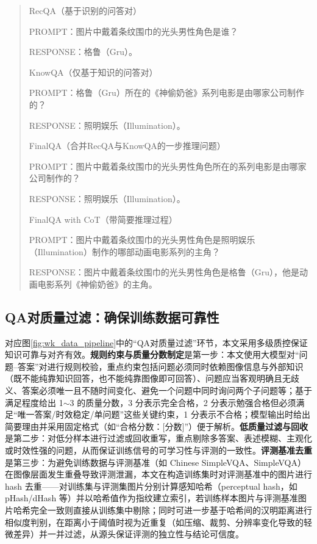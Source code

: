 \begin{quote}\small
RecQA（基于识别的问答对）
\par
PROMPT：图片中戴着条纹围巾的光头男性角色是谁？
\par
RESPONSE：格鲁（Gru）。
\par\medskip
KnowQA（仅基于知识的问答对）
\par
PROMPT：格鲁（Gru）所在的《神偷奶爸》系列电影是由哪家公司制作的？
\par
RESPONSE：照明娱乐（Illumination）。
\par\medskip
FinalQA（合并RecQA与KnowQA的一步推理问题）
\par
PROMPT：图片中戴着条纹围巾的光头男性角色所在的系列电影是由哪家公司制作的？
\par
RESPONSE：照明娱乐（Illumination）。
\par\medskip
FinalQA with CoT（带简要推理过程）
\par
PROMPT：图片中戴着条纹围巾的光头男性角色是照明娱乐（Illumination）制作的哪部动画电影系列的主角？
\par
RESPONSE：图片中戴着条纹围巾的光头男性角色是格鲁（Gru），他是动画电影系列《神偷奶爸》的主角。
\end{quote}

\subsection{QA对质量过滤：确保训练数据可靠性}
对应图\ref{fig:wk_data_pipeline}中的“QA对质量过滤”环节，本文采用多级质控保证知识可靠与对齐有效。\textbf{规则约束与质量分数制定}是第一步：本文使用大模型对“问题--答案”对进行规则校验，重点约束包括问题必须同时依赖图像信息与外部知识（既不能纯靠知识回答，也不能纯靠图像即可回答）、问题应当客观明确且无歧义、答案必须唯一且不随时间变化、避免一个问题中同时询问两个子问题等；基于满足程度给出 1$\sim$3 的质量分数，3 分表示完全合格，2 分表示勉强合格但必须满足“唯一答案/时效稳定/单问题”这些关键约束，1 分表示不合格；模型输出时给出简要理由并采用固定格式（如“合格分数：[分数]”）便于解析。\textbf{低质量过滤与回收}是第二步：对低分样本进行过滤或回收重写，重点剔除多答案、表述模糊、主观化或时效性强的问题，从而保证训练信号的可学习性与评测的一致性。\textbf{评测基准去重}是第三步：为避免训练数据与评测基准（如 Chinese SimpleVQA、SimpleVQA）在图像层面发生重叠导致评测泄漏，本文在构造训练集时对评测基准中的图片进行 hash 去重——对训练集与评测集图片分别计算感知哈希（perceptual hash，如 pHash/dHash 等）并以哈希值作为指纹建立索引，若训练样本图片与评测基准图片哈希完全一致则直接从训练集中剔除；同时可进一步基于哈希间的汉明距离进行相似度判别，在距离小于阈值时视为近重复（如压缩、裁剪、分辨率变化导致的轻微差异）并一并过滤，从源头保证评测的独立性与结论可信度。

